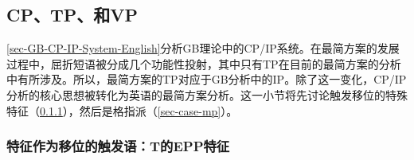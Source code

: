 \subsection{CP、TP、\vPc 和VP}
\label{sec-CP-TP-vP-VP}

\ref{sec-GB-CP-IP-System-English}分析GB理论中的CP/IP系统。在最简方案的发展过程中，屈折短语被分成几个功能性投射\citep{Chomsky89a-u}，其中只有TP在目前的最简方案的分析中有所涉及。所以，最简方案的TP对应于GB分析中的IP。除了这一变化，CP/IP分析的核心思想被转化为英语的最简方案分析。这一小节将先讨论触发移位的特殊特征（\ref{sec-epp-features}），然后是格指派（\ref{sec-case-mp}）。

\subsubsection{特征作为移位的触发语：T的EPP特征}
\label{sec-epp-features}

